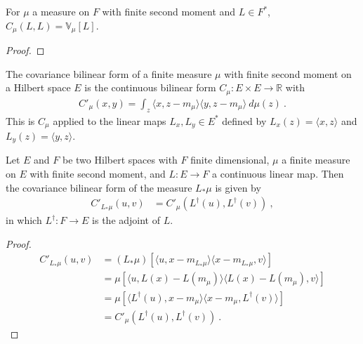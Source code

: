 \begin{lemma}\label{lem:covarianceBilin_same_eq_variance}
  \mathlibok
For $\mu$ a measure on $F$ with finite second moment and $L \in F^*$, $C_\mu(L, L) = \mathbb{V}_\mu[L]$.
\end{lemma}

\begin{proof}\leanok

\end{proof}


\begin{definition}\label{def:covInnerBilin}
  \leanok
The covariance bilinear form of a finite measure $\mu$ with finite second moment on a Hilbert space $E$ is the continuous bilinear form $C_\mu : E \times E \to \mathbb{R}$ with
\begin{align*}
  C'_\mu(x, y) = \int_z \langle x, z - m_\mu \rangle \langle y, z - m_\mu \rangle \: d\mu(z) \: .
\end{align*}
This is $C_\mu$ applied to the linear maps $L_x, L_y \in E^*$ defined by $L_x(z) = \langle x, z \rangle$ and $L_y(z) = \langle y, z \rangle$.
\end{definition}


\begin{lemma}\label{lem:covInnerBilin_map}
  \leanok
Let $E$ and $F$ be two Hilbert spaces with $F$ finite dimensional, $\mu$ a finite measure on $E$ with finite second moment, and $L : E \to F$ a continuous linear map.
Then the covariance bilinear form of the measure $L_*\mu$ is given by
\begin{align*}
  C'_{L_*\mu}(u, v)
  &= C'_\mu(L^\dagger(u), L^\dagger(v))
  \: ,
\end{align*}
in which $L^\dagger : F \to E$ is the adjoint of $L$.
\end{lemma}

\begin{proof}
\begin{align*}
  C'_{L_*\mu}(u, v)
  &= (L_*\mu)\left[\langle u, x - m_{L_*\mu}\rangle \langle x - m_{L_*\mu}, v \rangle\right]
  \\
  &= \mu\left[\langle u, L(x) - L(m_\mu)\rangle \langle L(x) - L(m_\mu), v \rangle \right]
  \\
  &= \mu\left[\langle L^\dagger(u), x - m_\mu\rangle \langle x - m_\mu, L^\dagger(v) \rangle \right]
  \\
  &= C'_\mu(L^\dagger(u), L^\dagger(v))
  \: .
\end{align*}
\end{proof}


